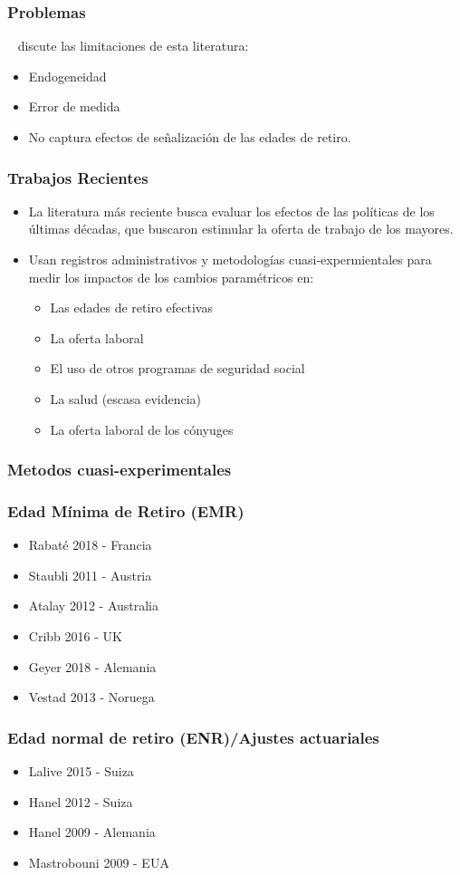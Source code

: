 \documentclass{beamer}
\begin{document}
\frame
{
  \frametitle{Problemas}
  
  ~\cite{mastrobouni09} discute las limitaciones de esta literatura:
  \begin{itemize}
  \item Endogeneidad
  \item Error de medida
  \item No captura efectos de señalización de las edades de retiro.
  \end{itemize}
}

\frame
{
  \frametitle{Trabajos Recientes}
  
  \begin{itemize}
  \item La literatura más reciente busca evaluar los efectos de las políticas de los últimas décadas, que buscaron estimular la oferta de trabajo de los mayores.
  \item Usan registros administrativos y metodologías cuasi-expermientales para medir los impactos de los cambios paramétricos en:
    \begin{itemize}
     \item Las edades de retiro efectivas
     \item La oferta laboral
     \item El uso de otros programas de seguridad social
     \item La salud (escasa evidencia)
     \item La oferta laboral de los cónyuges
     \end{itemize}
  \end{itemize}
}

\frame
{
  \frametitle{Metodos cuasi-experimentales}
  
}
\frame
{
  \frametitle{Edad Mínima de Retiro (EMR)}

    \begin{itemize}
    \item Rabaté 2018 - Francia
    \item Staubli 2011 - Austria
    \item Atalay 2012 - Australia
    \item Cribb 2016 - UK
    \item Geyer 2018 - Alemania
    \item Vestad 2013 - Noruega
    \end{itemize}
}
  \frame
  {
    \frametitle{Edad normal de retiro (ENR)/Ajustes actuariales}
    \begin{itemize}
    \item Lalive 2015 - Suiza
    \item Hanel 2012 - Suiza
    \item Hanel 2009 - Alemania
    \item Mastrobouni 2009 - EUA
    \end{itemize}
  }
\end{document}
